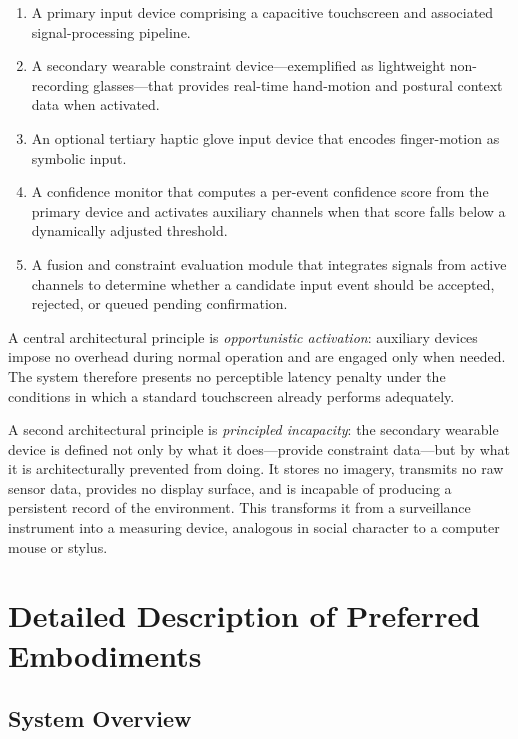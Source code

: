 \documentclass[11pt,letterpaper]{article}
\begin{document}
\begin{enumerate}[leftmargin=2em, label=\arabic*.]
  \item A primary input device comprising a capacitive touchscreen and associated
        signal-processing pipeline.
  \item A secondary wearable constraint device---exemplified as lightweight
        non-recording glasses---that provides real-time hand-motion and postural
        context data when activated.
  \item An optional tertiary haptic glove input device that encodes finger-motion
        as symbolic input.
  \item A confidence monitor that computes a per-event confidence score from the
        primary device and activates auxiliary channels when that score falls below
        a dynamically adjusted threshold.
  \item A fusion and constraint evaluation module that integrates signals from
        active channels to determine whether a candidate input event should be
        accepted, rejected, or queued pending confirmation.
\end{enumerate}

A central architectural principle is \emph{opportunistic activation}: auxiliary
devices impose no overhead during normal operation and are engaged only when needed.
The system therefore presents no perceptible latency penalty under the conditions
in which a standard touchscreen already performs adequately.

A second architectural principle is \emph{principled incapacity}: the secondary
wearable device is defined not only by what it does---provide constraint data---but
by what it is architecturally prevented from doing. It stores no imagery, transmits
no raw sensor data, provides no display surface, and is incapable of producing a
persistent record of the environment. This transforms it from a surveillance
instrument into a measuring device, analogous in social character to a computer
mouse or stylus.

\section{Detailed Description of Preferred Embodiments}

\subsection{System Overview}
\end{document}

